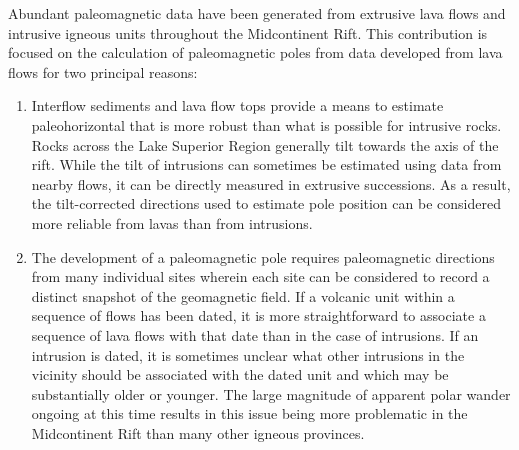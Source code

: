 \documentclass[11pt,letterpaper]{article}
\begin{document}
Abundant paleomagnetic data have been generated from extrusive lava flows and intrusive igneous units throughout the Midcontinent Rift. This contribution is focused on the calculation of paleomagnetic poles from data developed from lava flows for two principal reasons:
\begin{enumerate}
\item Interflow sediments and lava flow tops provide a means to estimate paleohorizontal that is more robust than what is possible for intrusive rocks. Rocks across the Lake Superior Region generally tilt towards the axis of the rift. While the tilt of intrusions can sometimes be estimated using data from nearby flows, it can be directly measured in extrusive successions. As a result, the tilt-corrected directions used to estimate pole position can be considered more reliable from lavas than from intrusions.
\item The development of a paleomagnetic pole requires paleomagnetic directions from many individual sites wherein each site can be considered to record a distinct snapshot of the geomagnetic field. If a volcanic unit within a sequence of flows has been dated, it is more straightforward to associate a sequence of lava flows with that date than in the case of intrusions. If an intrusion is dated, it is sometimes unclear what other intrusions in the vicinity should be associated with the dated unit and which may be substantially older or younger. The large magnitude of apparent polar wander ongoing at this time results in this issue being more problematic in the Midcontinent Rift than many other igneous provinces.
\end{enumerate}
\end{document}
